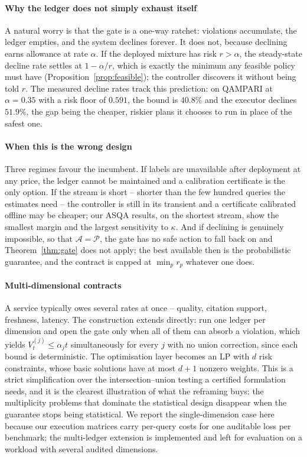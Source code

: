 \paragraph{Why the ledger does not simply exhaust itself}
A natural worry is that the gate is a one-way ratchet: violations
accumulate, the ledger empties, and the system declines forever. It does
not, because declining earns allowance at rate $\alpha$. If the deployed
mixture has risk $r > \alpha$, the steady-state decline rate settles at
$1 - \alpha/r$, which is exactly the minimum any feasible policy must
have (Proposition~\ref{prop:feasible}); the controller discovers it
without being told $r$. The measured decline rates track this
prediction: on QAMPARI at $\alpha = 0.35$ with a risk floor of $0.591$,
the bound is $40.8\%$ and the executor declines $51.9\%$, the gap being
the cheaper, riskier plans it chooses to run in place of the safest one.

\paragraph{When this is the wrong design}
Three regimes favour the incumbent. If labels are unavailable after
deployment at any price, the ledger cannot be maintained and a
calibration certificate is the only option. If the stream is short --
shorter than the few hundred queries the estimates need -- the
controller is still in its transient and a certificate calibrated
offline may be cheaper; our ASQA results, on the shortest stream, show
the smallest margin and the largest sensitivity to $\kappa$. And if
declining is genuinely impossible, so that $\mathcal{A} = \mathcal{P}$,
the gate has no safe action to fall back on and
Theorem~\ref{thm:gate} does not apply; the best available then is the
probabilistic guarantee, and the contract is capped at $\min_p r_p$
whatever one does.

\paragraph{Multi-dimensional contracts}
A service typically owes several rates at once -- quality, citation
support, freshness, latency. The construction extends directly: run one
ledger per dimension and open the gate only when all of them can absorb
a violation, which yields $V_t^{(j)} \le \alpha_j t$ simultaneously for
every $j$ with no union correction, since each bound is deterministic.
The optimisation layer becomes an LP with $d$ risk constraints, whose
basic solutions have at most $d+1$ nonzero weights. This is a strict
simplification over the intersection--union testing a certified
formulation needs, and it is the clearest illustration of what the
reframing buys: the multiplicity problems that dominate the statistical
design disappear when the guarantee stops being statistical. We report
the single-dimension case here because our execution matrices carry
per-query costs for one auditable loss per benchmark; the multi-ledger
extension is implemented and left for evaluation on a workload with
several audited dimensions.

